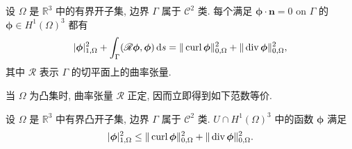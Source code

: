 \setcounter{statement}{7}
\begin{Lemma}\label{lem:sec3-curvature-div-curl-identity}
设 $\Omega$ 是 $\mathbb R^3$ 中的有界开子集, 边界 $\Gamma$ 属于
$\mathcal C^2$ 类. 每个满足 $\boldsymbol\phi\cdot\mathbf n=0$ on $\Gamma$ 的
$\boldsymbol\phi\in H^1(\Omega)^3$ 都有
\begin{equation}\label{eq:sec3-curvature-div-curl-identity}
|\boldsymbol\phi|_{1,\Omega}^2
+\int_\Gamma(\mathscr R\boldsymbol\phi,\boldsymbol\phi)\,\mathrm{d} s
=\|\operatorname{curl}\boldsymbol\phi\|_{0,\Omega}^2
+\|\operatorname{div}\boldsymbol\phi\|_{0,\Omega}^2,
\end{equation}
其中 $\mathscr R$ 表示 $\Gamma$ 的切平面上的曲率张量.
\end{Lemma}

当 $\Omega$ 为凸集时, 曲率张量 $\mathscr R$ 正定, 因而立即得到如下范数等价.

\setcounter{statement}{5}
\begin{Corollary}\label{cor:sec3-convex-smooth-div-curl-bound}
设 $\Omega$ 是 $\mathbb R^3$ 中有界凸开子集, 边界 $\Gamma$ 属于
$\mathcal C^2$ 类. $U\cap H^1(\Omega)^3$ 中的函数 $\boldsymbol\phi$ 满足
\begin{equation}\label{eq:sec3-convex-smooth-div-curl-bound}
|\boldsymbol\phi|_{1,\Omega}^2
\le\|\operatorname{curl}\boldsymbol\phi\|_{0,\Omega}^2
+\|\operatorname{div}\boldsymbol\phi\|_{0,\Omega}^2.
\end{equation}
\end{Corollary}

